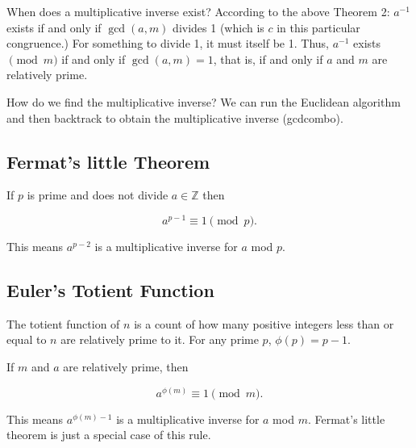 \documentclass[12pt,letterpaper]{article}
\newcommand\Z{\mathbb Z}
\begin{document}
When does a multiplicative inverse exist? According to the above Theorem 2: $a^{-1}$ exists if and only if $\gcd(a,m)$ divides 1 (which is $c$ in this particular congruence.) For something to divide 1, it must itself be 1. Thus, $a^{-1}$ exists $\pmod{m}$ if and only if $\gcd(a,m) = 1$, that is, if and only if $a$ and $m$ are relatively prime.

How do we find the multiplicative inverse? We can run the Euclidean algorithm and then backtrack to obtain the multiplicative inverse (gcdcombo).
        
\subsection{Fermat's \tiny{little} Theorem}

If $p$ is prime and does not divide $a \in \Z$ then

\[
a^{p-1} \equiv 1 \pmod{p}.
\]

This means $a^{p-2}$ is a multiplicative inverse for $a$ mod $p$.

\subsection{Euler's Totient Function}

The totient function of $n$ is a count of how many positive integers less than or equal to $n$ are relatively prime to it. For any prime $p$, $\phi(p) =p-1$. 

If $m$ and $a$ are relatively prime, then

\[
a^{\phi(m)} \equiv 1 \pmod{m}.
\]

This means $a^{\phi(m)-1}$ is a multiplicative inverse for $a$ mod $m$. Fermat's little theorem is just a special case of this rule.
\end{document}
